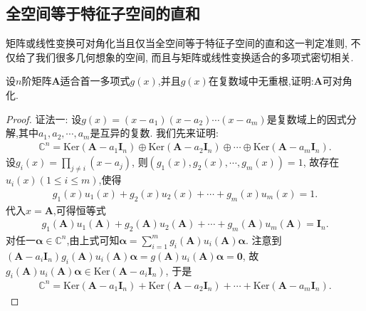 \documentclass[../../main.tex]{subfiles}
\begin{document}
\subsection{全空间等于特征子空间的直和}

矩阵或线性变换可对角化当且仅当全空间等于特征子空间的直和这一判定准则, 不仅给了我们很多几何想象的空间, 而且与矩阵或线性变换适合的多项式密切相关.

\begin{proposition}\label{proposition:适合的多项式无重根则可对角化}
设\(n\)阶矩阵\(\boldsymbol{A}\)适合首一多项式\(g(x)\),并且\(g(x)\)在复数域中无重根,证明:\(\boldsymbol{A}\)可对角化.
\end{proposition}
\begin{proof}
{\color{blue}证法一:}
设\(g(x) = (x - a_1)(x - a_2)\cdots(x - a_m)\)是复数域上的因式分解,其中\(a_1,a_2,\cdots,a_m\)是互异的复数. 我们先来证明:
\begin{align}
\mathbb{C}^n = \mathrm{Ker}(\boldsymbol{A} - a_1\boldsymbol{I}_n)\oplus \mathrm{Ker}(\boldsymbol{A} - a_2\boldsymbol{I}_n)\oplus\cdots\oplus \mathrm{Ker}(\boldsymbol{A} - a_m\boldsymbol{I}_n). \label{proposition0.7-6.5}
\end{align}
设\(g_i(x) = \prod_{j\neq i}(x - a_j)\), 则\((g_1(x),g_2(x),\cdots,g_m(x)) = 1\), 故存在\(u_i(x)(1\leqslant  i\leqslant  m)\),使得
\begin{align*}
g_1(x)u_1(x) + g_2(x)u_2(x) + \cdots + g_m(x)u_m(x) = 1.
\end{align*}
代入\(x = \boldsymbol{A}\),可得恒等式
\begin{align}
g_1(\boldsymbol{A})u_1(\boldsymbol{A}) + g_2(\boldsymbol{A})u_2(\boldsymbol{A}) + \cdots + g_m(\boldsymbol{A})u_m(\boldsymbol{A}) = \boldsymbol{I}_n. \label{proposition0.7-6.6}
\end{align}
对任一\(\boldsymbol{\alpha}\in \mathbb{C}^n\),由上式可知\(\boldsymbol{\alpha} = \sum_{i = 1}^{m}g_i(\boldsymbol{A})u_i(\boldsymbol{A})\boldsymbol{\alpha}\). 注意到\((\boldsymbol{A}-a_i\boldsymbol{I}_n)g_i(\boldsymbol{A})u_i(\boldsymbol{A})\boldsymbol{\alpha} = g(\boldsymbol{A})u_i(\boldsymbol{A})\boldsymbol{\alpha} = \boldsymbol{0}\), 故\(g_i(\boldsymbol{A})u_i(\boldsymbol{A})\boldsymbol{\alpha}\in \mathrm{Ker}(\boldsymbol{A} - a_i\boldsymbol{I}_n)\), 于是
\begin{align}
\mathbb{C}^n = \mathrm{Ker}(\boldsymbol{A} - a_1\boldsymbol{I}_n) + \mathrm{Ker}(\boldsymbol{A} - a_2\boldsymbol{I}_n) + \cdots + \mathrm{Ker}(\boldsymbol{A} - a_m\boldsymbol{I}_n). \label{proposition0.7-6.7}
\end{align}

\end{proof}
\end{document}
